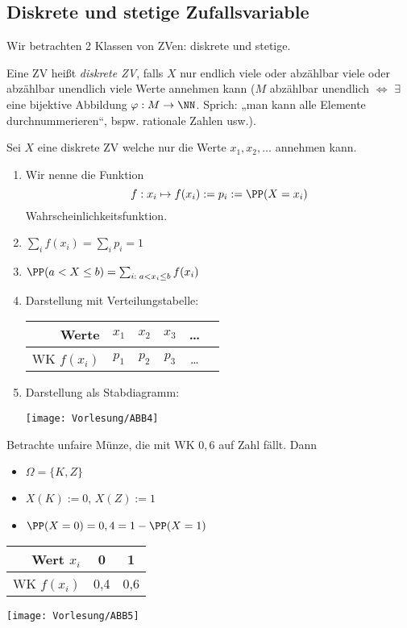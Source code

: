 \documentclass{scrreprt}
\renewenvironment{anumerate}{\begin{enumerate}[label=(\alph*)]}{\end{enumerate}} %
\begin{document}
\subsection{Diskrete und stetige Zufallsvariable}
Wir betrachten 2 Klassen von ZVen: diskrete und stetige.

 Eine ZV heißt \emph{diskrete ZV}, falls $X$ nur endlich viele oder abzählbar viele oder abzählbar unendlich viele Werte annehmen kann ($M$ abzählbar unendlich $\Leftrightarrow$ $\exists$ eine bijektive Abbildung $\varphi: M \to \NN$. Sprich: „man kann alle Elemente durchnummerieren“, bspw. rationale Zahlen usw.).


 Sei $X$ eine diskrete ZV welche nur die Werte $x_1, x_2 , \dots$ annehmen kann.
\begin{anumerate}
\item Wir nenne die Funktion
$$f: x_i\mapsto f(x_i):=p_i:= \PP(X=x_i)$$
Wahrscheinlichkeitsfunktion.
\item $\sum_i f(x_i)=\sum_i p_i =1$
\item $\PP(a < X \leq b) = \sum_{i:\; a<x_i \leq b} f(x_i)$
\item Darstellung mit Verteilungstabelle:\\
\begin{tabular}{r | c | c | c | c | c}
Werte & $x_1$ & $x_2$ & $x_3$& …\\
\hline
WK $f(x_i)$ & $p_1$ & $p_2$ & $p_3$ & …
\end{tabular}
\item Darstellung als Stabdiagramm:
\begin{center}
\texttt{[image: Vorlesung/ABB4]}
\end{center}
\end{anumerate}

 Betrachte unfaire Münze, die mit WK $0,6$ auf Zahl fällt. Dann
\begin{itemize}
\item $\Omega = \{ K, Z\}$
\item $X(K):=0$, $X(Z):=1$
\item $\PP(X=0)=0,4=1-\PP(X=1)$
\end{itemize}
\begin{tabular}{r | c | c}
Wert $x_i$ & 0 & 1\\
\hline 
WK $f(x_i)$ & 0,4 & 0,6
\end{tabular}
\begin{center}
\texttt{[image: Vorlesung/ABB5]}
\end{center}
\end{document}
